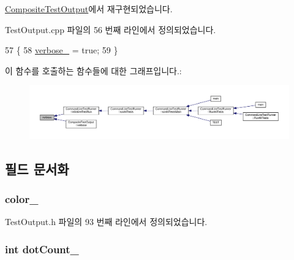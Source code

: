\hyperlink{class_composite_test_output_a2ae0a8d48809abb33b5ba47c56fdc3ad}{Composite\+Test\+Output}에서 재구현되었습니다.



Test\+Output.\+cpp 파일의 56 번째 라인에서 정의되었습니다.


\begin{DoxyCode}
57 \{
58     \hyperlink{class_test_output_a86126da532c138842a42d8e9a52b0806}{verbose\_} = \textcolor{keyword}{true};
59 \}
\end{DoxyCode}


이 함수를 호출하는 함수들에 대한 그래프입니다.\+:
\nopagebreak
\begin{figure}[H]
\begin{center}
\leavevmode
\includegraphics[width=350pt]{class_test_output_a2ae0a8d48809abb33b5ba47c56fdc3ad_icgraph}
\end{center}
\end{figure}




\subsection{필드 문서화}
\subsubsection[{\texorpdfstring{color\+\_\+}{color_}}]{ color\+\_\+\hspace{0.3cm}{\ttfamily [protected]}}\hypertarget{class_test_output_adda8c1875964c3b80ed1c77b585fc756}{}\label{class_test_output_adda8c1875964c3b80ed1c77b585fc756}


Test\+Output.\+h 파일의 93 번째 라인에서 정의되었습니다.

\subsubsection[{\texorpdfstring{dot\+Count\+\_\+}{dotCount_}}]{\setlength{\rightskip}{0pt plus 5cm}int dot\+Count\+\_\+\hspace{0.3cm}{\ttfamily [protected]}}\hypertarget{class_test_output_a3c1c7e8cf0310d384198f0dc504251c6}{}\label{class_test_output_a3c1c7e8cf0310d384198f0dc504251c6}


